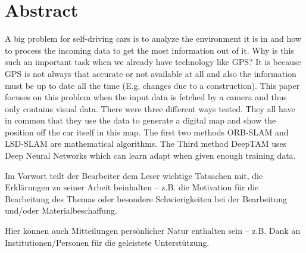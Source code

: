 

\chapter*{Abstract}
A big problem for self-driving cars is to analyze the environment it is in and how to process the incoming data to get the most information out of it.  Why is this such an important task when we already have technology like GPS? It is because GPS is not always that accurate or not available at all and also the information must be up to date all the time (E.g. changes due to a construction). This paper focuses on this problem when the input data is fetched by a camera and thus only contains visual data. There were three different ways tested. They all have in common that they use the data to generate a digital map and show the position off the car itself in this map. The first two methods ORB-SLAM and LSD-SLAM are mathematical algorithms. The Third method DeepTAM uses Deep Neural Networks which can learn adapt when given enough training data. 




Im Vorwort teilt der Bearbeiter dem Leser wichtige Tatsachen mit, die Erklärungen zu seiner Arbeit beinhalten -- z.B. die Motivation für die Bearbeitung des Themas oder besondere Schwierigkeiten bei der Bearbeitung und/oder Materialbeschaffung. 

Hier können auch Mitteilungen persönlicher Natur enthalten sein -- z.B. Dank an Institutionen/Personen für die geleistete Unterstützung. 